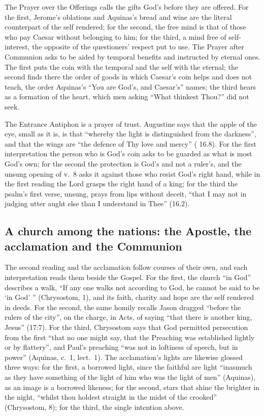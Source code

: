 The Prayer over the Offerings calls the gifts God's before they are offered.
For the first, Jerome's oblations and Aquinas's bread and wine are the literal
counterpart of the self rendered; for the second, the free mind is that of
those who pay Caesar without belonging to him; for the third, a mind free of
self-interest, the opposite of the questioners' respect put to use. The Prayer
after Communion asks to be aided by temporal benefits and instructed by eternal
ones. The first puts the coin with the temporal and the self with the eternal;
the second finds there the order of goods in which Caesar's coin helps and does
not teach, the order Aquinas's ``You are God's, and Caesar's'' names; the third
hears  as a formation of the heart, which men asking ``What
thinkest Thou?'' did not seek.

The Entrance Antiphon is a prayer of trust. Augustine says that the apple of
the eye, small as it is, is that ``whereby the light is distinguished from the
darkness'', and that the wings are ``the defence of Thy love and mercy''
( 16.8). For the first interpretation the person
who is God's coin asks to be guarded as what is most God's own; for the second
the protection is God's and not a ruler's, and the unsung opening of v.~8 asks
it against those who resist God's right hand, while in the first reading the
Lord grasps the right hand of a king; for the third the psalm's first verse,
unsung, prays from lips without deceit, ``that I may not in judging utter aught
else than I understand in Thee'' (16.2).

\subsection{A church among the nations: the Apostle, the acclamation and the Communion}

The second reading and the acclamation follow courses of their own, and each
interpretation reads them beside the Gospel. For the first, the church ``in
God'' describes a walk, ``If any one walks not according to God, he cannot be
said to be `in God' '' (Chrysostom,  1),
and its faith, charity and hope are the self rendered in deeds. For the second,
the same homily recalls Jason dragged ``before the rulers of the city'', on the
charge, in Acts, of saying ``that there is another king, Jesus'' (17:7). For the
third, Chrysostom says that God permitted persecution from the first ``that no
one might say, that the Preaching was established lightly or by flattery'', and Paul's preaching
``was not in loftiness of speech, but in power'' (Aquinas,  c.~1, lect.~1). The acclamation's lights are likewise
glossed three ways: for the first, a borrowed light, since the faithful are
light ``inasmuch as they have something of the light of him who was the
light of men'' (Aquinas), as an image is a borrowed likeness; for the second,
stars that shine
the brighter in the night, ``whilst thou holdest straight in the midst of the
crooked'' (Chrysostom,  8); for the third, the
single intention above.

